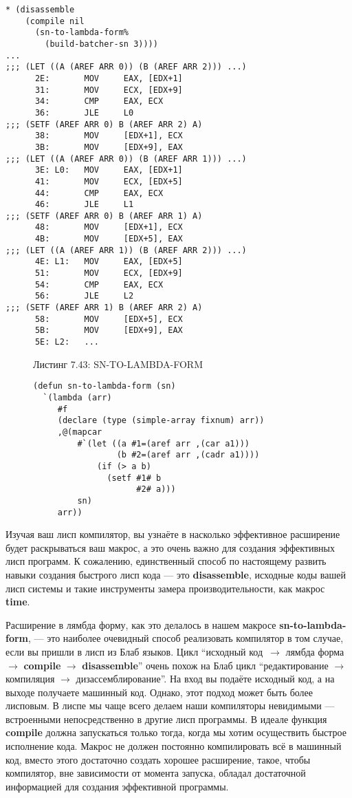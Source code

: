 \begin{verbatim}
* (disassemble
    (compile nil
      (sn-to-lambda-form%
        (build-batcher-sn 3))))
...
;;; (LET ((A (AREF ARR 0)) (B (AREF ARR 2))) ...)
      2E:       MOV     EAX, [EDX+1]
      31:       MOV     ECX, [EDX+9]
      34:       CMP     EAX, ECX
      36:       JLE     L0
;;; (SETF (AREF ARR 0) B (AREF ARR 2) A)
      38:       MOV     [EDX+1], ECX
      3B:       MOV     [EDX+9], EAX
;;; (LET ((A (AREF ARR 0)) (B (AREF ARR 1))) ...)
      3E: L0:   MOV     EAX, [EDX+1]
      41:       MOV     ECX, [EDX+5]
      44:       CMP     EAX, ECX
      46:       JLE     L1
;;; (SETF (AREF ARR 0) B (AREF ARR 1) A)
      48:       MOV     [EDX+1], ECX
      4B:       MOV     [EDX+5], EAX
;;; (LET ((A (AREF ARR 1)) (B (AREF ARR 2))) ...)
      4E: L1:   MOV     EAX, [EDX+5]
      51:       MOV     ECX, [EDX+9]
      54:       CMP     EAX, ECX
      56:       JLE     L2
;;; (SETF (AREF ARR 1) B (AREF ARR 2) A)
      58:       MOV     [EDX+5], ECX
      5B:       MOV     [EDX+9], EAX
      5E: L2:   ...
\end{verbatim}

\begin{figure}Листинг 7.43: SN-TO-LAMBDA-FORM\label{listing_7.43}
\listbegin
\begin{verbatim}
(defun sn-to-lambda-form (sn)
  `(lambda (arr)
     #f
     (declare (type (simple-array fixnum) arr))
     ,@(mapcar
         #`(let ((a #1=(aref arr ,(car a1)))
                 (b #2=(aref arr ,(cadr a1))))
             (if (> a b)
               (setf #1# b
                     #2# a)))
         sn)
     arr))
\end{verbatim}
\listend
\end{figure}

Изучая ваш лисп компилятор, вы узнаёте в насколько эффективное расширение будет раскрываться ваш макрос, а это очень важно для создания эффективных лисп программ. К сожалению, единственный способ по настоящему развить навыки создания быстрого лисп кода --- это \textbf{disassemble}, исходные коды вашей лисп системы и такие инструменты замера производительности, как макрос \textbf{time}.

Расширение в лямбда форму, как это делалось в нашем макросе \textbf{sn-to-lambda-form}, --- это наиболее очевидный способ реализовать компилятор в том случае, если вы пришли в лисп из Блаб языков. Цикл ``исходный код~$\to$ лямбда форма $\to$ \textbf{compile} $\to$ \textbf{disassemble}'' очень похож на Блаб цикл ``редактирование $\to$ компиляция $\to$ дизассемблирование''. На вход вы подаёте исходный код, а на выходе получаете машинный код. Однако, этот подход может быть более лисповым. В лиспе мы чаще всего делаем наши компиляторы невидимыми --- встроенными непосредственно в другие лисп программы. В идеале функция \textbf{compile} должна запускаться только тогда, когда мы хотим осуществить быстрое исполнение кода. Макрос не должен постоянно компилировать всё в машинный код, вместо этого достаточно создать хорошее расширение, такое, чтобы компилятор, вне зависимости от момента запуска, обладал достаточной информацией для создания эффективной программы.

